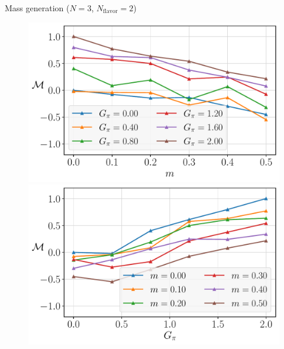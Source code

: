 \begin{frame}[allowframebreaks]{Mass generation ($N=3$, $N_\text{flavor}=2$)}
  \begin{figure}[!tbp]
  	\centering
  	\begin{minipage}[c]{.40\linewidth}
  		\centering
  		\includegraphics[width=\linewidth]{Figures/chapter06/g-ratio-curves}
  	\end{minipage}
    \hspace{.025\linewidth}
  	\begin{minipage}[c]{.40\linewidth}
  		\centering
  		\includegraphics[width=\linewidth]{Figures/chapter06/m-ratio-curves}
  	\end{minipage}
  \end{figure}

\end{frame}
